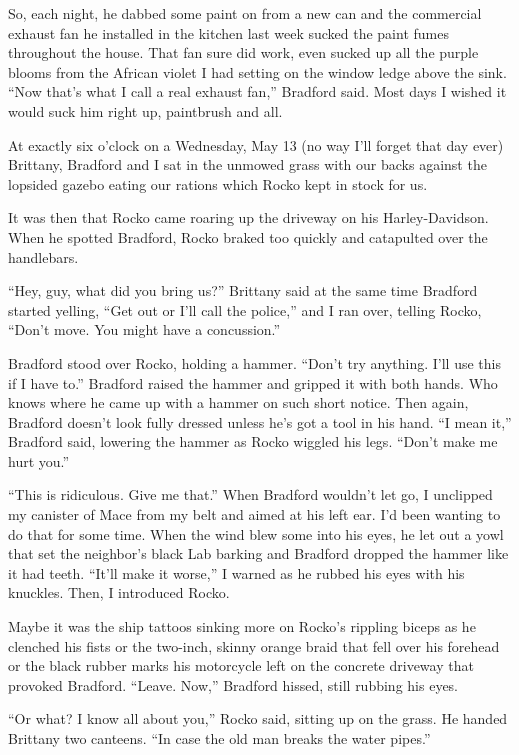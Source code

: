 \documentclass[twoside,10pt]{book}
\begin{document}
So, each night, he dabbed some paint on from a new can and the
commercial exhaust fan he installed in the kitchen last week sucked the
paint fumes throughout the house. That fan sure did work, even sucked up
all the purple blooms from the African violet I had setting on the
window ledge above the sink. ``Now that's what I call a real exhaust
fan,'' Bradford said. Most days I wished it would suck him right up,
paintbrush and all.

At exactly six o'clock on a Wednesday, May 13 (no way I'll forget that
day ever) Brittany, Brad­ford and I sat in the unmowed grass with our
backs against the lopsided gazebo eating our rations which Rocko kept in
stock for us.

It was then that Rocko came roaring up the driveway on his
Harley-Davidson. When he spot­ted Bradford, Rocko braked too quickly and
catapulted over the handlebars.

``Hey, guy, what did you bring us?'' Brittany said at the same time
Bradford started yelling, ``Get out or I'll call the police,'' and I ran
over, telling Rocko, ``Don't move. You might have a con­cussion.''

Bradford stood over Rocko, holding a hammer. ``Don't try anything. I'll
use this if I have to.'' Bradford raised the hammer and gripped it with
both hands. Who knows where he came up with a hammer on such short
notice. Then again, Bradford doesn't look fully dressed unless he's got
a tool in his hand. ``I mean it,'' Bradford said, lowering the hammer as
Rocko wiggled his legs. ``Don't make me hurt you.''

``This is ridiculous. Give me that.'' When Bradford wouldn't let go, I
unclipped my canister of Mace from my belt and aimed at his left ear.
I'd been wanting to do that for some time. When the wind blew some into
his eyes, he let out a yowl that set the neighbor's black Lab barking
and Bradford dropped the hammer like it had teeth. ``It'll make it
worse,'' I warned as he rubbed his eyes with his knuckles. Then, I
introduced Rocko.

Maybe it was the ship tattoos sinking more on Rocko's rippling biceps as
he clenched his fists or the two-inch, skinny orange braid that fell
over his forehead or the black rubber marks his motorcy­cle left on the
concrete driveway that provoked Bradford. ``Leave. Now,'' Bradford
hissed, still rubbing his eyes.

``Or what? I know all about you,'' Rocko said, sitting up on the grass.
He handed Brittany two canteens. ``In case the old man breaks the water
pipes.''
\end{document}

